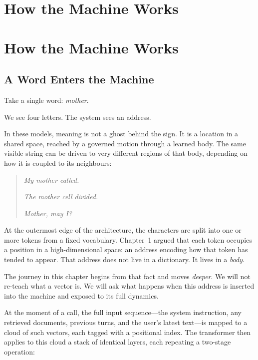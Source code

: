 \chapter{How the Machine Works}

\chapter{How the Machine Works}
\thispagestyle{plain}



\bigskip

\section{A Word Enters the Machine}

Take a single word: \emph{mother}.

We see four letters. The system sees an address.

In these models, meaning is not a ghost behind the sign. It is a location in a shared space, reached by a governed motion through a learned body. The same visible string can be driven to very different regions of that body, depending on how it is coupled to its neighbours:

\begin{quote}
\emph{My mother called.}

\emph{The mother cell divided.}

\emph{Mother, may I?}
\end{quote}

At the outermost edge of the architecture, the characters are split into one or more tokens from a fixed vocabulary. Chapter~1 argued that each token occupies a position in a high-dimensional space: an address encoding how that token has tended to appear. That address does not live in a dictionary. It lives in a \emph{body}.

The journey in this chapter begins from that fact and moves \emph{deeper}. We will not re-teach what a vector is. We will ask what happens when this address is inserted into the machine and exposed to its full dynamics.

At the moment of a call, the full input sequence---the system instruction, any retrieved documents, previous turns, and the user's latest text---is mapped to a cloud of such vectors, each tagged with a positional index. The transformer then applies to this cloud a stack of identical layers, each repeating a two-stage operation:


